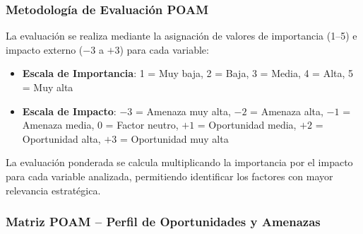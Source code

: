 \subsubsection{Metodología de Evaluación POAM}

La evaluación se realiza mediante la asignación de valores de importancia (1--5) e impacto externo ($-3$ a $+3$) para cada variable:

\begin{itemize}
\item \textbf{Escala de Importancia}: 1 = Muy baja, 2 = Baja, 3 = Media, 4 = Alta, 5 = Muy alta
\item \textbf{Escala de Impacto}: $-3$ = Amenaza muy alta, $-2$ = Amenaza alta, $-1$ = Amenaza media, 0 = Factor neutro, $+1$ = Oportunidad media, $+2$ = Oportunidad alta, $+3$ = Oportunidad muy alta
\end{itemize}

La evaluación ponderada se calcula multiplicando la importancia por el impacto para cada variable analizada, permitiendo identificar los factores con mayor relevancia estratégica.

\subsubsection{Matriz POAM -- Perfil de Oportunidades y Amenazas}


